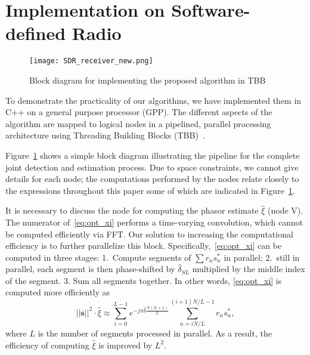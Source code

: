 \section{Implementation on Software-defined Radio}%
\label{sec:implementation_on_SDR}

\begin{figure}[t]
    \centerline{\texttt{[image: SDR\_receiver\_new.png]}}
    \caption{Block diagram for implementing the proposed algorithm in TBB}
    \label{fig:SDR_receiver}
    \end{figure}

To demonstrate the practicality of our algorithms, we have implemented them in C++ on a general
purpose processor (GPP).
The different aspects of the algorithm are mapped to logical nodes in a pipelined, parallel processing architecture
using Threading Building Blocks (TBB)~\cite{Michael_19}.

Figure~\ref{fig:SDR_receiver} shows a simple block diagram
illustrating the pipeline for the complete joint detection and
estimation process.
Due to space constraints, we cannot give details for each node; the
computations performed by the nodes relate closely to the expressions
throughout this paper some of which are indicated in Figure~\ref{fig:SDR_receiver}.

It is necessary to discuss the node for computing the phasor estimate $\hat{\xi}$ (node V). 
The numerator of~\eqref{eq:opt_xi} performs a time-varying
convolution,
which cannot be computed efficiently via FFT.
Our solution to increasing the computational efficiency is to further
parallelize this block.
Specifically,~\eqref{eq:opt_xi} can be computed in three stages:
1.~Compute  segments of $\sum r_ns_n^*$ in  parallel;
2.~still in parallel, each segment is then phase-shifted by $\hat{\delta}_{SL}$
multiplied by the middle index of the 
segment.
3. Sum all segments together.
In other words, \eqref{eq:opt_xi} is computed more efficiently as
\begin{equation}
  \label{eq:refined_opt_S}
  ||\bm{s}||^2\cdot\hat{\xi} \approx \sum_{i=0}^{L-1} e^{-j\pi \hat{\delta}\frac{N(2i+1)}{L}}
  \sum_{n=iN/L}^{(i+1)N/L-1}r_ns_n^*,
\end{equation}
where $L$ is the number of segments processed in parallel.
As a result,
the efficiency of computing $\hat{\xi}$ is improved by $L^2$.

